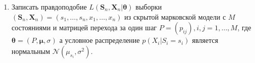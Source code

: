 \documentclass[a4paper,12pt]{extreport}
\renewcommand{\=}[1]{\stackrel{#1}{=}} %
\begin{document}
\begin{enumerate}
	\item Записать правдоподобие $L(\bm{S}_n, \bm{X}_n| \bm{\theta})$
	выборки $(\bm{S}_n, \bm{X}_n) = (s_1, \ldots, s_n, x_1, \ldots, x_n)$ из
	скрытой марковской модели с $M$ состояниями и матрицей
	перехода за один шаг $P = (p_{ij}), i, j = 1, \ldots, M$,
	где $\bm{\theta} = (P, \bm{\mu}, \sigma)$
	а условное распределение $p(X_i | S_i = s_i)$ является
	нормальным $\mathcal{N}(\mu_{s_i}, \sigma^2)$.


\end{enumerate}
\end{document}
